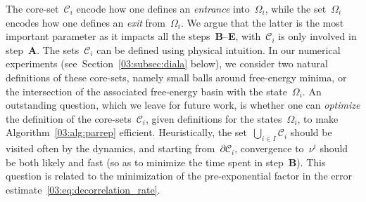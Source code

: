     The core-set~$\mathcal C_i$ encode how one defines an \textit{entrance} into~$\Omega_i$, while the set~$\Omega_i$ encodes how one defines an \textit{exit} from~$\Omega_i$. We argue that the latter is the most important parameter as it impacts all the steps~{\bf B}--{\bf E}, with~$\mathcal C_i$ is only involved in step~{\bf{A}}. The sets~$\mathcal C_i$ can be defined using physical intuition. In our numerical experiments (see~Section~\ref{03:subsec:diala} below), we consider two natural definitions of these core-sets, namely small balls around free-energy minima, or the intersection of the associated free-energy basin with the state~$\Omega_i$.
    An outstanding question, which we leave for future work, is whether one can \textit{optimize} the definition of the core-sets~$\mathcal C_i$, given definitions for the states~$\Omega_i$, to make Algorithm~\ref{03:alg:parrep} efficient. Heuristically, the set~$\bigcup_{i\in I}\mathcal C_i$ should be visited often by the dynamics, and starting from~$\partial\mathcal C_i$, convergence to~$\nu^i$ should be both likely and fast (so as to minimize the time spent in step~{\bf B}). This question is related to the minimization of the pre-exponential factor in the error estimate~\eqref{03:eq:decorrelation_rate}.

